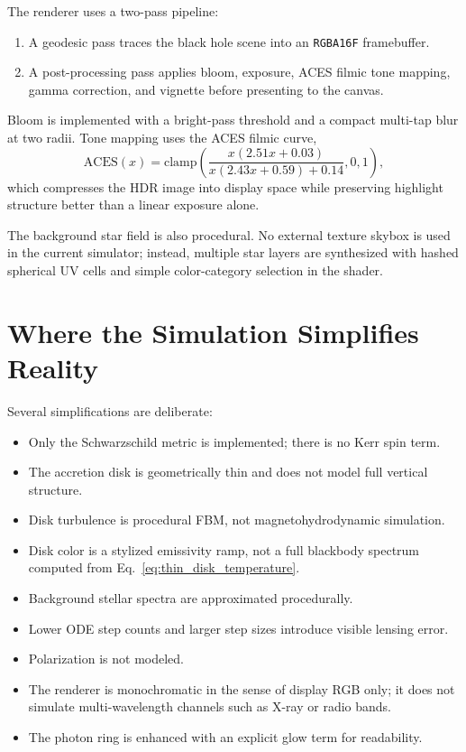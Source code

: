 \documentclass[12pt]{article}
\begin{document}
The renderer uses a two-pass pipeline:
\begin{enumerate}
\item A geodesic pass traces the black hole scene into an \texttt{RGBA16F} framebuffer.
\item A post-processing pass applies bloom, exposure, ACES filmic tone mapping, gamma correction, and vignette before presenting to the canvas.
\end{enumerate}

Bloom is implemented with a bright-pass threshold and a compact multi-tap blur at two radii. Tone mapping uses the ACES filmic curve,
\begin{equation}
\mathrm{ACES}(x) = \mathrm{clamp}\!\left(\frac{x(2.51x + 0.03)}{x(2.43x + 0.59) + 0.14}, 0, 1\right),
\label{eq:aces}
\end{equation}
which compresses the HDR image into display space while preserving highlight structure better than a linear exposure alone.

The background star field is also procedural. No external texture skybox is used in the current simulator; instead, multiple star layers are synthesized with hashed spherical UV cells and simple color-category selection in the shader.

\section{Where the Simulation Simplifies Reality}
Several simplifications are deliberate:
\begin{itemize}
\item Only the Schwarzschild metric is implemented; there is no Kerr spin term.
\item The accretion disk is geometrically thin and does not model full vertical structure.
\item Disk turbulence is procedural FBM, not magnetohydrodynamic simulation.
\item Disk color is a stylized emissivity ramp, not a full blackbody spectrum computed from Eq.~\eqref{eq:thin_disk_temperature}.
\item Background stellar spectra are approximated procedurally.
\item Lower ODE step counts and larger step sizes introduce visible lensing error.
\item Polarization is not modeled.
\item The renderer is monochromatic in the sense of display RGB only; it does not simulate multi-wavelength channels such as X-ray or radio bands.
\item The photon ring is enhanced with an explicit glow term for readability.
\end{itemize}
\end{document}
